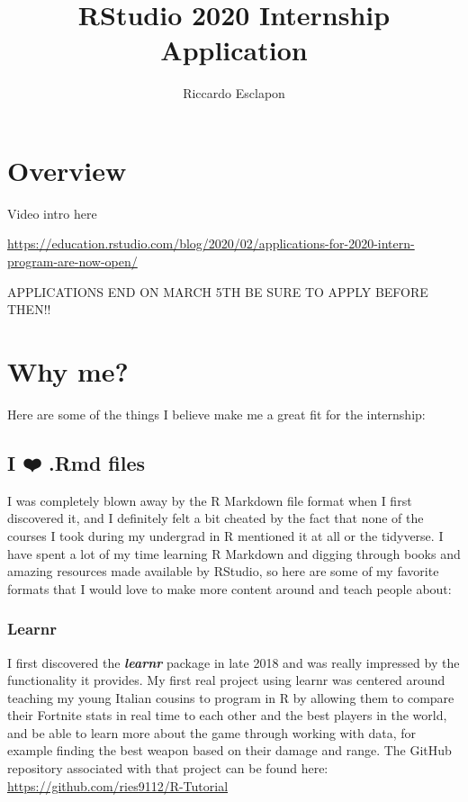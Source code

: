 \documentclass[
]{book}
\title{RStudio 2020 Internship Application}
\author{Riccardo Esclapon}
\date{}
\begin{document}
\maketitle

{
\setcounter{tocdepth}{1}
\tableofcontents
}
\hypertarget{overview}{%
\chapter{Overview}\label{overview}}

Video intro here

\url{https://education.rstudio.com/blog/2020/02/applications-for-2020-intern-program-are-now-open/}

APPLICATIONS END ON MARCH 5TH BE SURE TO APPLY BEFORE THEN!!

\hypertarget{fit}{%
\chapter{Why me?}\label{fit}}

Here are some of the things I believe make me a great fit for the internship:

\hypertarget{i-uxfe0f-.rmd-files}{%
\section{I ❤️ .Rmd files}\label{i-uxfe0f-.rmd-files}}

I was completely blown away by the R Markdown file format when I first discovered it, and I definitely felt a bit cheated by the fact that none of the courses I took during my undergrad in R mentioned it at all or the tidyverse. I have spent a lot of my time learning R Markdown and digging through books and amazing resources made available by RStudio, so here are some of my favorite formats that I would love to make more content around and teach people about:

\hypertarget{learnr}{%
\subsection{Learnr}\label{learnr}}

I first discovered the \textbf{\emph{learnr}} \citep{R-learnr} package in late 2018 and was really impressed by the functionality it provides. My first real project using learnr was centered around teaching my young Italian cousins to program in R by allowing them to compare their Fortnite stats in real time to each other and the best players in the world, and be able to learn more about the game through working with data, for example finding the best weapon based on their damage and range. The GitHub repository associated with that project can be found here: \url{https://github.com/ries9112/R-Tutorial}
\end{document}
